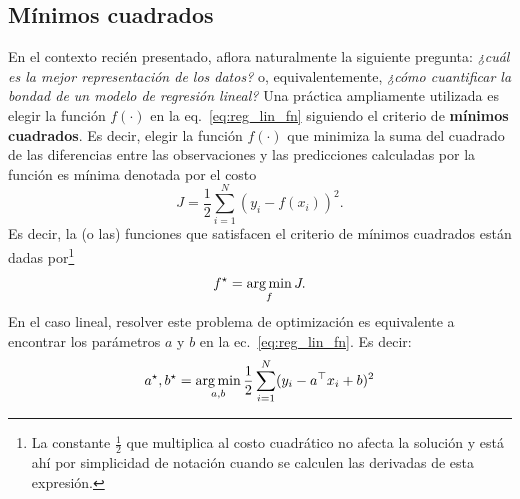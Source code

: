 \subsection{Mínimos cuadrados} %
\label{ssub:min_cuad}
En el contexto recién presentado, aflora naturalmente la siguiente pregunta: \emph{¿cuál es la mejor representación de los datos?} o, equivalentemente, \emph{¿cómo cuantificar la bondad de un modelo de regresión lineal?} Una práctica ampliamente utilizada es elegir la función $f(\cdot)$ en la eq.~\eqref{eq:reg_lin_fn} siguiendo el criterio de \textbf{mínimos cuadrados}. Es decir, elegir la función $f(\cdot)$ que minimiza la suma del cuadrado de las diferencias entre las observaciones y las predicciones calculadas por la función es mínima denotada por el costo
\begin{equation}
	J = \frac{1}{2}\sum_{i=1}^N(y_i-f(x_i))^2.
	\label{eq:least_squares_cost}
\end{equation}
Es decir, la (o las) funciones que satisfacen el criterio de mínimos cuadrados están dadas por\footnote{La constante $\frac{1}{2}$ que multiplica al costo cuadrático no afecta la solución y está ahí por simplicidad de notación cuando se calculen las derivadas de esta expresión.} 
\begin{equation}
	f^\star = \operatorname*{arg\,min}_{f} J.
\end{equation}
En el caso lineal, resolver este problema de optimización es equivalente a encontrar los parámetros $a$ y $b$ en la ec.~\eqref{eq:reg_lin_fn}. Es decir: 
\begin{equation}
	a^\star,b^\star = \operatorname*{arg\,min}_{a,b} \frac{1}{2}\sum_{i=1}^N(y_i-a^
	\top x_i + b)^2
	\label{eq:lin_least_squares}
\end{equation}

